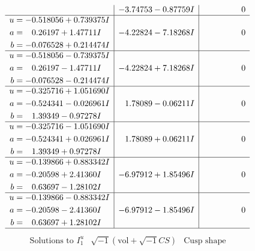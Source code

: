 \documentclass[1p]{elsarticle_modified}
\theoremstyle{definition}
\newcommand{\I}{\sqrt{-1}}
\begin{document}
$$\begin{array}{c|c|c}
 & -3.74753 - 0.87759 I & \phantom{-0.000000 } 0 \\ \hline\begin{aligned}
u &= -0.518056 + 0.739375 I \\
a &= \phantom{-}0.26197 + 1.47711 I \\
b &= -0.076528 + 0.214474 I\end{aligned}
 & -4.22824 - 7.18268 I & \phantom{-0.000000 } 0 \\ \hline\begin{aligned}
u &= -0.518056 - 0.739375 I \\
a &= \phantom{-}0.26197 - 1.47711 I \\
b &= -0.076528 - 0.214474 I\end{aligned}
 & -4.22824 + 7.18268 I & \phantom{-0.000000 } 0 \\ \hline\begin{aligned}
u &= -0.325716 + 1.051690 I \\
a &= -0.524341 - 0.026961 I \\
b &= \phantom{-}1.39349 - 0.97278 I\end{aligned}
 & \phantom{-}1.78089 - 0.06211 I & \phantom{-0.000000 } 0 \\ \hline\begin{aligned}
u &= -0.325716 - 1.051690 I \\
a &= -0.524341 + 0.026961 I \\
b &= \phantom{-}1.39349 + 0.97278 I\end{aligned}
 & \phantom{-}1.78089 + 0.06211 I & \phantom{-0.000000 } 0 \\ \hline\begin{aligned}
u &= -0.139866 + 0.883342 I \\
a &= -0.20598 + 2.41360 I \\
b &= \phantom{-}0.63697 - 1.28102 I\end{aligned}
 & -6.97912 + 1.85496 I & \phantom{-0.000000 } 0 \\ \hline\begin{aligned}
u &= -0.139866 - 0.883342 I \\
a &= -0.20598 - 2.41360 I \\
b &= \phantom{-}0.63697 + 1.28102 I\end{aligned}
 & -6.97912 - 1.85496 I & \phantom{-0.000000 } 0\\
 \hline 
 \end{array}$$\newpage$$\begin{array}{c|c|c}  
\text{Solutions to }I^u_{1}& \I (\text{vol} + \sqrt{-1}CS) & \text{Cusp shape}\\

\end{array}$$
\end{document}
